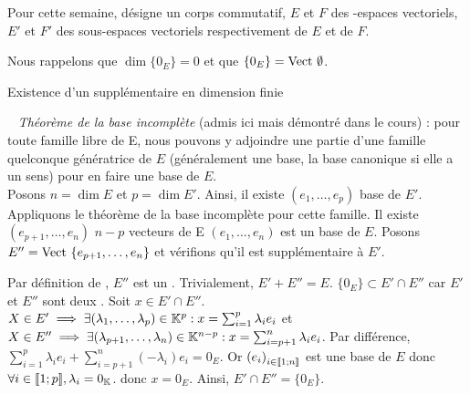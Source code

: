 \documentclass{article}
\date{13 Avril 2024}
\begin{document}
\maketitle

Pour cette semaine, \K désigne un corps commutatif, $E$ et $F$ des \K\!\!-espaces vectoriels, $E'$ et $F'$ des sous-espaces vectoriels respectivement de $E$ et de $F$.

Nous rappelons que $\dim \{0_E\} = 0$ et que $\{0_E\} = \text{Vect } \emptyset$.

\begin{question_kholle}
	{Existence d'un supplémentaire en dimension finie}

	~\newline
	\textit{Théorème de la base incomplète} (admis ici mais démontré dans le cours) : pour toute famille libre de E, nous pouvons y adjoindre une partie d'une famille quelconque génératrice de $E$ (généralement une base, la base canonique si elle a un sens) pour en faire une base de $E$. \\

	Posons $n = \dim E$ et $p = \dim E'$. Ainsi, il existe $(e_1, \ldots, e_p)$ base de $E'$.
	Appliquons le théorème de la base incomplète pour cette famille.
	Il existe $(e_{p+1}, \ldots, e_n)$ $n-p$ vecteurs de E \tq $(e_1, \ldots, e_n)$ est un base de $E$.
	Posons $E'' = \text{Vect } \{ e_{p+1}, \ldots, e_n \}$ et vérifions qu'il est supplémentaire à $E'$.

	Par définition de \Vect\!\!, $E''$ est un \sev.
	Trivialement, $E' + E'' = E$.
	$\{0_E\} \subset E' \cap E''$ car $E'$ et $E''$ sont deux \sevs.
	Soit $x \in E' \cap E''$.
	$X \in E' \implies \exists (\lambda_1, \ldots, \lambda_p) \in \mathbb K^p : x = \sum_{i=1}^{p} \lambda_i e_i$ et
	$X \in E'' \implies \exists (\lambda_{p+1}, \ldots, \lambda_n) \in \mathbb K^{n-p} : x = \sum_{i=p+1}^{n} \lambda_i e_i$.
	Par différence, $\sum_{i=1}^{p} \lambda_i e_i + \sum_{i=p+1}^{n} \left(-\lambda_i\right) e_i = 0_E$.
	Or $\left(e_i\right)_{i \in [\![ 1 ; n ]\!]}$ est une base de $E$ donc $\forall i \in [\![ 1 ; p ]\!], \lambda_i = 0_{\mathbb K}$.
	donc $x = 0_E$.
	Ainsi, $E' \cap E'' = \{0_E\}$.
\end{question_kholle}
\end{document}
